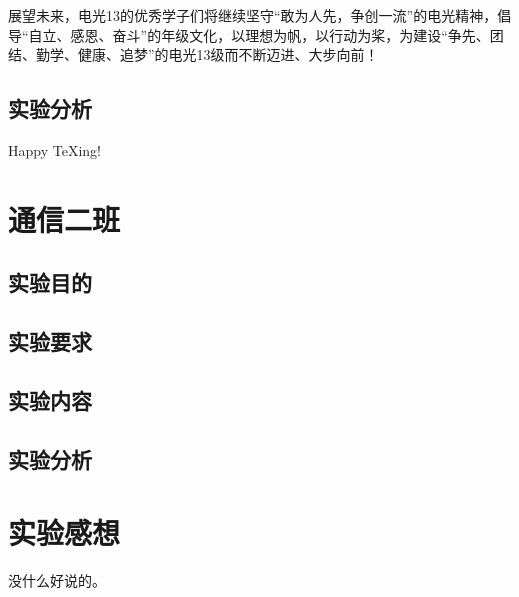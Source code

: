 \documentclass[a4paper,12pt]{report}
\begin{document}
\begin{spacing}{1.5}
展望未来，电光13的优秀学子们将继续坚守“敢为人先，争创一流”的电光精神，倡导“自立、感恩、奋斗”的年级文化，以理想为帆，以行动为桨，为建设“争先、团结、勤学、健康、追梦”的电光13级而不断迈进、大步向前！

\section{实验分析}
Happy TeXing!
\end{spacing}

\chapter{通信二班}

\begin{spacing}{1.5}
\section{实验目的}

\section{实验要求}

\section{实验内容}

\section{实验分析}

\end{spacing}

\chapter{实验感想}
\begin{spacing}{1.5}
	没什么好说的。
\end{spacing}
\end{document}
